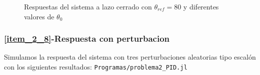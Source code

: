 \begin{figure}[H]
   \centering
   \caption{Respuestas del sistema a lazo cerrado con $\theta_{ref}=80$ y diferentes valores de $\theta_{0}$}
\end{figure}

\subsubsection{\ref{item_2_8}-Respuesta con perturbacion}
Simulamos la respuesta del sistema con tres perturbaciones aleatorias tipo escalón con los siguientes resultados:
\verb|Programas/problema2_PID.jl|

